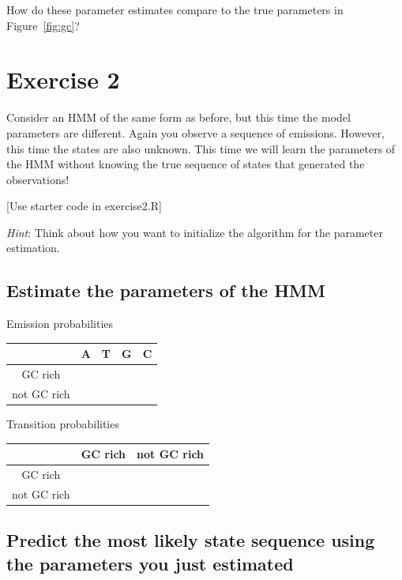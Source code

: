 \documentclass[11pt, oneside]{article}
\begin{document}
How do these parameter estimates compare to the true parameters in Figure~\ref{fig:gc}?

\section{Exercise 2}
Consider an HMM of the same form as before, but this time the model parameters are different. 
Again you observe a sequence of emissions. 
However, this time the states are also unknown. 
This time we will learn the parameters of the HMM without knowing the true sequence of states that generated the observations! 

[Use starter code in exercise2.R]

\textit{Hint}: Think about how you want to initialize the algorithm for the parameter estimation. 

\subsection{Estimate the parameters of the HMM}
Emission probabilities
\begin{table}[H]
\centering
\begin{tabular}{|c|c|c|c|c|}
\hline
& A & T & G & C \\\hline
GC rich & & & &  \\\hline
not GC rich & & & & \\\hline
\end{tabular}
\end{table}

Transition probabilities
\begin{table}[H]
\centering
\begin{tabular}{|c|c|c|}
\hline
& GC rich & not GC rich \\\hline
GC rich & &  \\\hline
not GC rich & &  \\\hline
\end{tabular}
\end{table}

\subsection{Predict the most likely state sequence using the parameters you just estimated}
\end{document}
